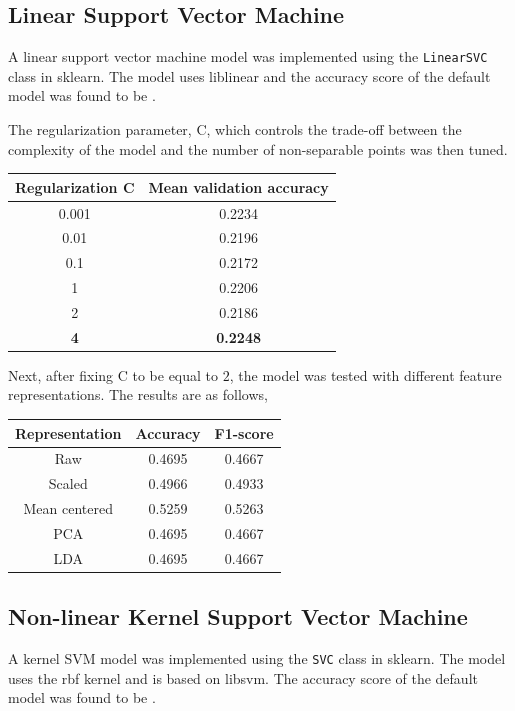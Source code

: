\documentclass[12pt]{article}
\begin{document}
\subsection*{Linear Support Vector Machine}

A linear support vector machine model was implemented using the \texttt{LinearSVC} class in sklearn. The model uses liblinear and the accuracy score of the default model was found to be $ $.

The regularization parameter, C, which controls the trade-off between the complexity of the model and the number of non-separable points was then tuned.

\begin{center}
\begin{tabular}{|c|c|}
 \hline
 Regularization C& Mean validation accuracy \\
 \hline
 0.001 & 0.2234\\
 0.01 & 0.2196\\
 0.1 & 0.2172\\
 1 & 0.2206\\
 2 & 0.2186\\
 \textbf{4} & \textbf{0.2248}\\
 \hline
\end{tabular}
\end{center}

Next, after fixing C to be equal to $2$, the model was tested with different feature representations. The results are as follows,

\begin{center}
  \begin{tabular}{|c|c|c|}
    \hline
    Representation & Accuracy & F1-score \\
    \hline
    Raw & 0.4695 & 0.4667\\
    Scaled & 0.4966 & 0.4933 \\
    Mean centered & 0.5259 & 0.5263\\
    PCA & 0.4695 & 0.4667\\
    LDA & 0.4695 & 0.4667 \\
    \hline
  \end{tabular}
\end{center}

\subsection*{Non-linear Kernel Support Vector Machine}

A kernel SVM model was implemented using the \texttt{SVC} class in sklearn. The model uses the rbf kernel and is based on libsvm. The accuracy score of the default model was found to be $ $.
\end{document}
